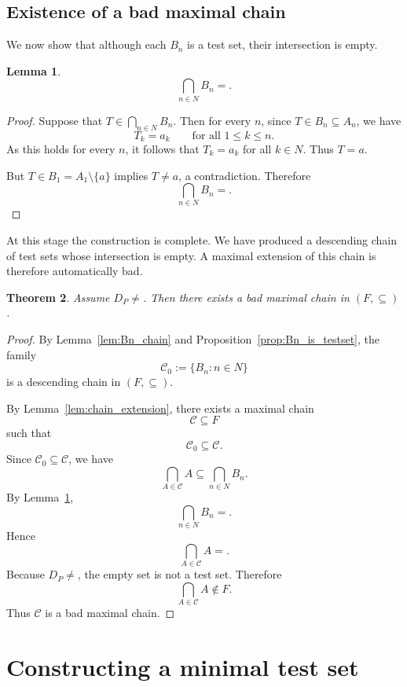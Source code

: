 \documentclass[11pt]{amsart}
\theoremstyle{plain}
\newtheorem{theorem}{Theorem}[section]
\newtheorem{lemma}[theorem]{Lemma}
\theoremstyle{definition}
\theoremstyle{remark}
\newcommand{\Dp}{\mathcal{D}_P}
\newcommand{\F}{\mathcal{F}}
\newcommand{\N}{\mathbb{N}}
\def\Dp{D_P}%
\def\F{F}%
\def\N{N}%
\def\emptyset{}%
\begin{document}
\subsection{Existence of a bad maximal chain}

We now show that although each $B_n$ is a test set, their intersection is empty.

\begin{lemma}\label{lem:Bn_intersection_empty}
\[
\bigcap_{n\in\N} B_n=\emptyset.
\]
\end{lemma}

\begin{proof}
Suppose that $T\in\bigcap_{n\in\N} B_n$.
Then for every $n$, since $T\in B_n\subseteq A_n$, we have
\[
T_k=a_k \qquad\text{for all } 1\le k\le n.
\]
As this holds for every $n$, it follows that $T_k=a_k$ for all $k\in\N$.
Thus $T=a$.

But $T\in B_1=A_1\setminus\{a\}$ implies $T\neq a$, a contradiction.
Therefore
\[
\bigcap_{n\in\N} B_n=\emptyset.
\]
\end{proof}

At this stage the construction is complete.
We have produced a descending chain of test sets whose intersection is empty.
A maximal extension of this chain is therefore automatically bad.

\begin{theorem}\label{thm:bad_chain_exists}
Assume $\Dp\neq\emptyset$.
Then there exists a bad maximal chain in $(\F,\subseteq)$.
\end{theorem}

\begin{proof}
By Lemma~\ref{lem:Bn_chain} and Proposition~\ref{prop:Bn_is_testset}, the family
\[
\mathcal C_0:=\{B_n:n\in\N\}
\]
is a descending chain in $(\F,\subseteq)$.

By Lemma~\ref{lem:chain_extension}, there exists a maximal chain
\[
\mathcal C\subseteq\F
\]
such that
\[
\mathcal C_0\subseteq\mathcal C.
\]
Since $\mathcal C_0\subseteq\mathcal C$, we have
\[
\bigcap_{A\in\mathcal C}A \subseteq \bigcap_{n\in\N}B_n.
\]
By Lemma~\ref{lem:Bn_intersection_empty},
\[
\bigcap_{n\in\N}B_n=\emptyset.
\]
Hence
\[
\bigcap_{A\in\mathcal C}A=\emptyset.
\]
Because $\Dp\neq\emptyset$, the empty set is not a test set.
Therefore
\[
\bigcap_{A\in\mathcal C}A\notin\F.
\]
Thus $\mathcal C$ is a bad maximal chain.
\end{proof}

\section{Constructing a minimal test set}\label{sec:minimal}
\end{document}
